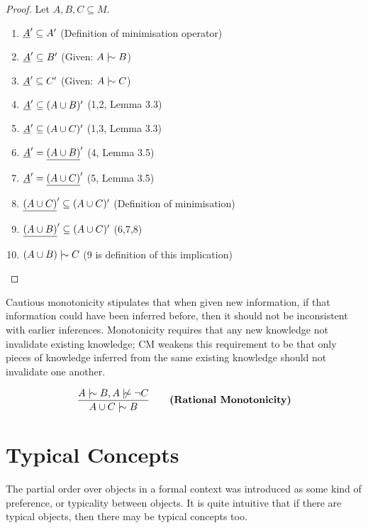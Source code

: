 \documentclass[11pt]{article}
\begin{document}
\begin{proof}
  Let $A, B, C \subseteq M$.
  \begin{enumerate}
    \item $\underline{A}' \subseteq A'$ \hfill (Definition of minimisation operator)
    \item $\underline{A}' \subseteq B'$ \hfill (Given: $A \twiddle B$)
    \item $\underline{A}' \subseteq C'$ \hfill (Given: $A \twiddle C$)
    \item $\underline{A}' \subseteq (A \cup B)' $ \hfill (1,2, Lemma 3.3)
    \item $\underline{A}' \subseteq (A \cup C)' $ \hfill (1,3, Lemma 3.3)
    \item $\underline{A}' = \underline{(A\cup B)}'$ \hfill (4, Lemma 3.5)
    \item $\underline{A}' = \underline{(A \cup C)}'$ \hfill (5, Lemma 3.5)
    \item $\underline{(A\cup C)}' \subseteq (A \cup C)'$ \hfill (Definition of minimisation)
    \item $\underline{(A\cup B)}' \subseteq (A\cup C)'$ \hfill (6,7,8)
    \item $(A\cup B) \twiddle C$ \hfill (9 is definition of this implication)
  \end{enumerate}
\end{proof}

\begin{remark}
  Cautious monotonicity stipulates that when given new information, if that information could have been inferred before, then it should not be inconsistent with earlier inferences. Monotonicity requires that any new knowledge not invalidate existing knowledge; CM weakens this requirement to be that only pieces of knowledge inferred from the same existing knowledge should not invalidate one another.
\end{remark}

\begin{equation}
  \frac{A \twiddle B, A \ntwiddle \neg C}{A \cup C \twiddle B} \qquad \textbf{(Rational Monotonicity)}
\end{equation}

\clearpage
\section{Typical Concepts}

The partial order over objects in a formal context was introduced as some kind of preference, or typicality between objects. It is quite intuitive that if there are typical objects, then there may be typical concepts too.
\end{document}
